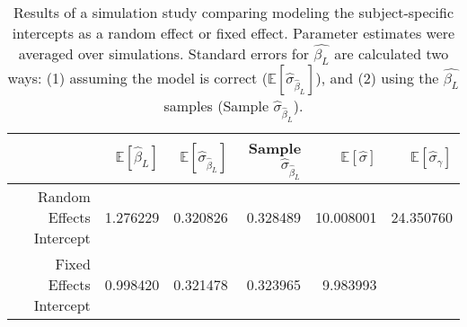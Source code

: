 \begin{table}[ht]
\centering
\begingroup\small
\begin{tabular}{rrrrrr}
  \toprule
 & $\mathbb{E}\left[\hat{\beta}_L\right]$ & $\mathbb{E}\left[\hat{\sigma}_{\hat{\beta}_L}\right]$ & Sample $\hat{\sigma}_{\hat{\beta}_L}$ & $\mathbb{E}\left[\hat{\sigma}\right]$ & $\mathbb{E}\left[\hat{\sigma}_{\gamma}\right]$ \\ 
  \midrule
Random Effects Intercept & 1.276229 & 0.320826 & 0.328489 & 10.008001 & 24.350760 \\ 
  Fixed Effects Intercept & 0.998420 & 0.321478 & 0.323965 & 9.983993 &  \\ 
   \bottomrule
\end{tabular}
\endgroup
\caption{\small Results of a simulation study comparing modeling the  subject-specific intercepts as a random effect or fixed effect. Parameter estimates were averaged over simulations. Standard errors for $\hat{\beta_L}$ are calculated two ways: (1) assuming the model is correct ($\mathbb{E}\left[\hat{\sigma}_{\hat{\beta}_L}\right]$), and (2) using the $\hat{\beta_L}$ samples (Sample $\hat{\sigma}_{\hat{\beta}_L}$).} 
\label{tab:simulation_comparison}
\end{table}
